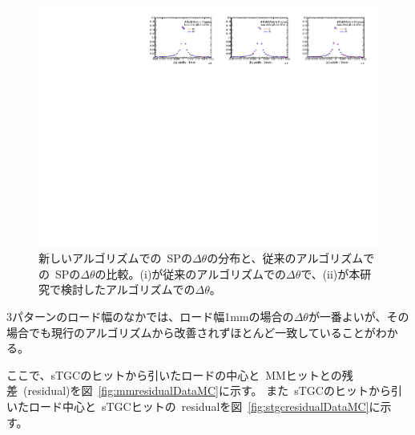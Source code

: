 \begin{figure}[h]
    \centering
    \includegraphics[clip, width=14cm]{fig/5/deltaTheta_multiWidth.pdf}
    \caption{新しいアルゴリズムでの~SPの$\Delta \theta$の分布と、従来のアルゴリズムでの~SPの$\Delta \theta$の比較。(i)が従来のアルゴリズムでの$\Delta \theta$で、(ii)が本研究で検討したアルゴリズムでの$\Delta \theta$。}
    \label{fig:deltaThetaMultiWidth}
\end{figure}

3パターンのロード幅のなかでは、ロード幅1mmの場合の$\Delta \theta$が一番よいが、その場合でも現行のアルゴリズムから改善されずほとんど一致していることがわかる。

ここで、sTGCのヒットから引いたロードの中心と~MMヒットとの残差~(residual)を図~\ref{fig:mmresidualDataMC}に示す。
また~sTGCのヒットから引いたロード中心と~sTGCヒットの~residualを図~\ref{fig:stgcresidualDataMC}に示す。

